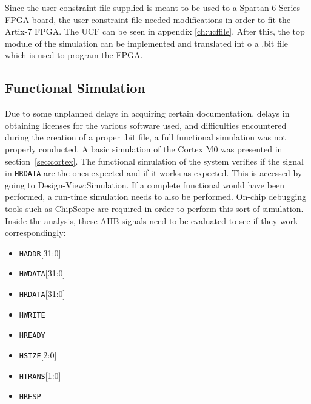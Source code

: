 Since the user constraint file supplied is meant to be used to a Spartan 6 Series FPGA board, the user constraint file needed modifications in order to fit the Artix-7 FPGA. The UCF can be seen in appendix \ref{ch:ucffile}. After this, the top module of the simulation can be implemented and translated int o a .bit file which is used to program the FPGA.

\subsection{Functional Simulation}
Due to some unplanned delays in acquiring certain documentation, delays in obtaining licenses for the various software used, and difficulties encountered during the creation of a proper .bit file, a full functional simulation was not properly conducted. A basic simulation of the Cortex M0 was presented in section~\ref{sec:cortex}.  The functional simulation of the system verifies if the signal in \verb|HRDATA| are the ones expected and if it works as expected. This is accessed by going to Design-View:Simulation. If a complete functional would have been performed, a run-time simulation needs to also be performed. On-chip debugging tools such as ChipScope are required in order to perform this sort of simulation. Inside the analysis, these AHB signals need to be evaluated to see if they work correspondingly: 
\begin{itemize}
\item \verb|HADDR|[31:0] 
\item \verb|HWDATA|[31:0]
\item \verb|HRDATA|[31:0]
\item \verb|HWRITE|
\item \verb|HREADY|
\item \verb|HSIZE|[2:0]
\item \verb|HTRANS|[1:0]
\item \verb|HRESP|
\end{itemize}
